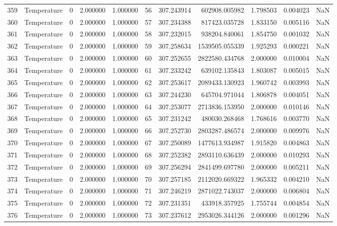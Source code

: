 \begin{tabular}{llrrrrrrrrr}
359 & Temperature & 0 & 2.000000 & 1.000000 & 56 & 307.243914 & 602908.005982 & 1.798503 & 0.004023 & NaN \\
360 & Temperature & 0 & 2.000000 & 1.000000 & 57 & 307.234388 & 817423.035728 & 1.833150 & 0.005116 & NaN \\
361 & Temperature & 0 & 2.000000 & 1.000000 & 58 & 307.232015 & 938204.840061 & 1.854750 & 0.001032 & NaN \\
362 & Temperature & 0 & 2.000000 & 1.000000 & 59 & 307.258634 & 1539505.055339 & 1.925293 & 0.000221 & NaN \\
363 & Temperature & 0 & 2.000000 & 1.000000 & 60 & 307.252655 & 2822580.434768 & 2.000000 & 0.010004 & NaN \\
364 & Temperature & 0 & 2.000000 & 1.000000 & 61 & 307.233242 & 639102.135843 & 1.803087 & 0.005015 & NaN \\
365 & Temperature & 0 & 2.000000 & 1.000000 & 62 & 307.253617 & 2089433.130923 & 1.960742 & 0.003993 & NaN \\
366 & Temperature & 0 & 2.000000 & 1.000000 & 63 & 307.244230 & 645704.971044 & 1.806878 & 0.004051 & NaN \\
367 & Temperature & 0 & 2.000000 & 1.000000 & 64 & 307.253077 & 2713836.153950 & 2.000000 & 0.010146 & NaN \\
368 & Temperature & 0 & 2.000000 & 1.000000 & 65 & 307.231242 & 480030.268468 & 1.768616 & 0.003770 & NaN \\
369 & Temperature & 0 & 2.000000 & 1.000000 & 66 & 307.252730 & 2803287.486574 & 2.000000 & 0.009976 & NaN \\
370 & Temperature & 0 & 2.000000 & 1.000000 & 67 & 307.250089 & 1477613.934987 & 1.915820 & 0.004863 & NaN \\
371 & Temperature & 0 & 2.000000 & 1.000000 & 68 & 307.252382 & 2893110.636439 & 2.000000 & 0.010293 & NaN \\
372 & Temperature & 0 & 2.000000 & 1.000000 & 69 & 307.256294 & 2841499.697780 & 2.000000 & 0.005211 & NaN \\
373 & Temperature & 0 & 2.000000 & 1.000000 & 70 & 307.257185 & 2112020.669322 & 1.965332 & 0.004210 & NaN \\
374 & Temperature & 0 & 2.000000 & 1.000000 & 71 & 307.246219 & 2871022.743037 & 2.000000 & 0.006804 & NaN \\
375 & Temperature & 0 & 2.000000 & 1.000000 & 72 & 307.231351 & 433918.357925 & 1.755744 & 0.004854 & NaN \\
376 & Temperature & 0 & 2.000000 & 1.000000 & 73 & 307.237612 & 2953026.344126 & 2.000000 & 0.001296 & NaN \\

\end{tabular}
